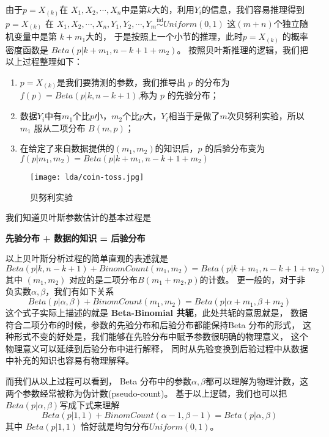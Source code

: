 由于$p=X_{(k)}$在 $X_1,X_2,\cdots,X_n $中是第$k$大的，利用$Y_i$的信息，我们容易推理得到 $p=X_{(k)}$ 在
$X_1,X_2,\cdots,X_n,Y_1,Y_2,\cdots,Y_m {\stackrel{\mathrm{iid}}{\sim}} Uniform(0,1)$ 这$(m+n)$个独立随机变量中是第 $k+m_1$大的，
于是按照上一个小节的推理，此时$p=X_{(k)}$ 的概率密度函数是 $Beta(p|k+m_1,n-k+1+m_2)$。
按照贝叶斯推理的逻辑，我们把以上过程整理如下：
\begin{enumerate}
\item $p=X_{(k)}$是我们要猜测的参数，我们推导出 $p$ 的分布为 $f(p) = Beta(p|k,n-k+1)$,称为 $p$ 的先验分布；
\item 数据$Y_i$中有$m_1$个比$p$小，$m_2$个比$p$大，$Y_i$相当于是做了$m$次贝努利实验，所以$m_1$ 服从二项分布 $B(m,p)$；
\item 在给定了来自数据提供的$(m_1,m_2)$的知识后，$p$ 的后验分布变为 $f(p|m_1,m_2)=Beta(p|k+m_1,n-k+1+m_2)$
\end{enumerate}
\begin{figure}[htbp]
\centering
\texttt{[image: lda/coin-toss.jpg]}
\caption{贝努利实验}
\end{figure}
我们知道贝叶斯参数估计的基本过程是
\begin{center}
 \bf{先验分布 + 数据的知识  = 后验分布}
\end{center}
以上贝叶斯分析过程的简单直观的表述就是
$$ Beta(p|k,n-k+1) + BinomCount(m_1,m_2) = Beta(p|k+m_1,n-k+1+m_2) $$
其中 $(m_1,m_2)$ 对应的是二项分布$B(m_1+m_2,p)$的计数。
更一般的，对于非负实数$\alpha,\beta$，我们有如下关系
\begin{equation}
 Beta(p|\alpha,\beta) + BinomCount(m_1,m_2) = Beta(p|\alpha+m_1,\beta+m_2)
\end{equation}
这个式子实际上描述的就是 {\bf Beta-Binomial 共轭}，此处共轭的意思就是，
数据符合二项分布的时候，参数的先验分布和后验分布都能保持Beta 分布的形式，
这种形式不变的好处是，我们能够在先验分布中赋予参数很明确的物理意义，
这个物理意义可以延续到后验分布中进行解释，
同时从先验变换到后验过程中从数据中补充的知识也容易有物理解释。

而我们从以上过程可以看到，
Beta 分布中的参数$\alpha,\beta$都可以理解为物理计数，这两个参数经常被称为伪计数(pseudo-count)。
基于以上逻辑，我们也可以把$Beta(p|\alpha,\beta)$写成下式来理解
\begin{equation}
\label{uniform-beta}
Beta(p|1,1) + BinomCount(\alpha-1,\beta-1) = Beta(p|\alpha,\beta)
\end{equation}
其中 $Beta(p|1,1)$ 恰好就是均匀分布$Uniform(0,1)$。

